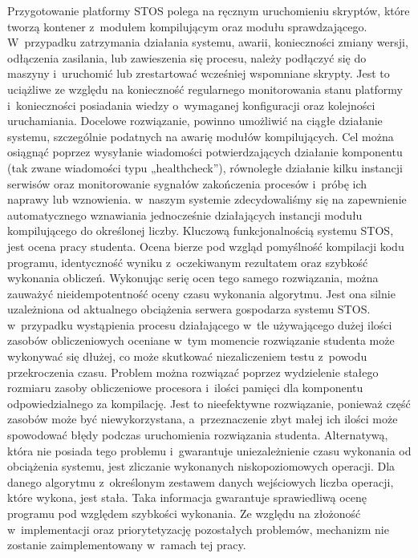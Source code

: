 \newline \indent Przygotowanie platformy STOS polega na ręcznym uruchomieniu skryptów, które tworzą kontener z~modułem kompilującym oraz modułu sprawdzającego. W~przypadku zatrzymania działania systemu, awarii, konieczności zmiany wersji, odłączenia zasilania, lub zawieszenia się procesu, należy podłączyć się do maszyny i~uruchomić lub zrestartować wcześniej wspomniane skrypty. Jest to uciążliwe ze względu na konieczność regularnego monitorowania stanu platformy i~konieczności posiadania wiedzy o~wymaganej konfiguracji oraz kolejności uruchamiania. Docelowe rozwiązanie, powinno umożliwić na ciągłe działanie systemu, szczególnie podatnych na awarię modułów kompilujących. Cel można osiągnąć poprzez wysyłanie wiadomości potwierdzających działanie komponentu (tak zwane wiadomości typu „healthcheck”), równoległe działanie kilku instancji serwisów oraz monitorowanie sygnałów zakończenia procesów i~próbę ich naprawy lub wznowienia. w~naszym systemie zdecydowaliśmy się na zapewnienie automatycznego wznawiania jednocześnie działających instancji modułu kompilującego do określonej liczby.
\newline \indent Kluczową funkcjonalnością systemu STOS, jest ocena pracy studenta. Ocena bierze pod wzgląd pomyślność kompilacji kodu programu, identyczność wyniku z~oczekiwanym rezultatem oraz szybkość wykonania obliczeń. Wykonując serię ocen tego samego rozwiązania, można zauważyć nieidempotentność oceny czasu wykonania algorytmu. Jest ona silnie uzależniona od aktualnego obciążenia serwera gospodarza systemu STOS. w~przypadku wystąpienia procesu działającego w~tle używającego dużej ilości zasobów obliczeniowych oceniane w~tym momencie rozwiązanie studenta może wykonywać się dłużej, co może skutkować niezaliczeniem testu z~powodu przekroczenia czasu. Problem można rozwiązać poprzez wydzielenie stałego rozmiaru zasoby obliczeniowe procesora i~ilości pamięci dla komponentu odpowiedzialnego za kompilację. Jest to nieefektywne rozwiązanie, ponieważ część zasobów może być niewykorzystana, a~przeznaczenie zbyt małej ich ilości może spowodować błędy podczas uruchomienia rozwiązania studenta. Alternatywą, która nie posiada tego problemu i~gwarantuje uniezależnienie czasu wykonania od obciążenia systemu, jest zliczanie wykonanych niskopoziomowych operacji. Dla danego algorytmu z~określonym zestawem danych wejściowych liczba operacji, które wykona, jest stała. Taka informacja gwarantuje sprawiedliwą ocenę programu pod względem szybkości wykonania. Ze względu na złożoność w~implementacji oraz priorytetyzację pozostałych problemów, mechanizm nie zostanie zaimplementowany w~ramach tej pracy.